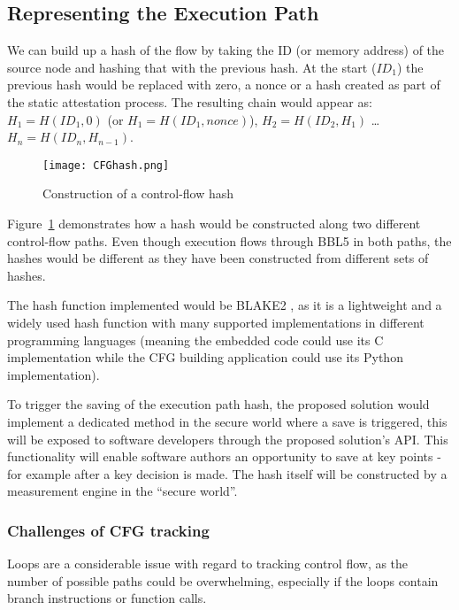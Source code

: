 \subsection{Representing the Execution Path}

We can build up a hash of the flow by taking the ID (or memory address) of the source node and hashing that with the previous hash. At the start ($ID_1$) the previous hash would be replaced with zero, a nonce or a hash created as part of the static attestation process. The resulting chain would appear as: 
$H_1 = H(ID_1,0)$ (or $H_1 = H(ID_1,nonce)$), $H_2 = H(ID_2,H_1)$ \ldots $H_n = H(ID_n,H_{n-1})$.

\begin{figure}
  \centering
  \vspace*{0.5in}
  \texttt{[image: CFGhash.png]}
  \caption{Construction of a control-flow hash}
  \label{fig:controlFlowHash}
\end{figure}

Figure~\ref{fig:controlFlowHash} demonstrates how a hash would be constructed along two different control-flow paths. Even though execution flows through BBL5 in both paths, the hashes would be different as they have been constructed from different sets of hashes.

The hash function implemented would be BLAKE2 \cite{Aumasson2013}, as it is a lightweight and a widely used hash function with many supported implementations in different programming languages (meaning the embedded code could use its C implementation while the CFG building application could use its Python implementation).

To trigger the saving of the execution path hash, the proposed solution would implement a dedicated method in the secure world where a save is triggered, this will be exposed to software developers through the proposed solution's API. This functionality will enable software authors an opportunity to save at key points - for example after a key decision is made. The hash itself will be constructed by a measurement engine in the ``secure world''.

\subsubsection*{Challenges of CFG tracking}

Loops are a considerable issue with regard to tracking control flow, as the number of possible paths could be overwhelming, especially if the loops contain branch instructions or function calls.

